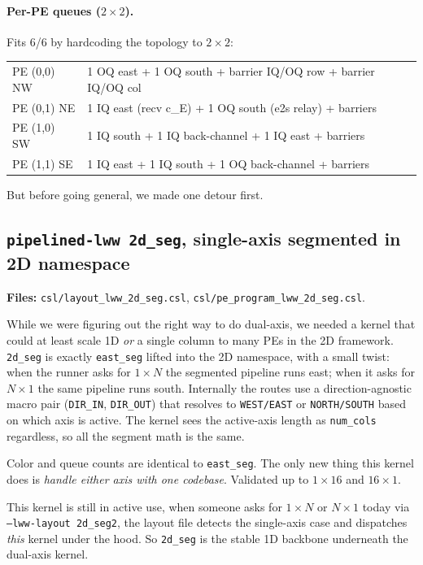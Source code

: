 \documentclass[11pt]{article}
\newcommand{\code}[1]{\texttt{#1}}
\newcommand{\file}[1]{\texttt{#1}}
\begin{document}
\paragraph{Per-PE queues ($2 \times 2$).} Fits 6/6 by hardcoding
the topology to $2 \times 2$:

\begin{center}\footnotesize
\begin{tabular}{ll}
\toprule
PE (0,0) NW & 1 OQ east + 1 OQ south + barrier IQ/OQ row + barrier IQ/OQ col \\
PE (0,1) NE & 1 IQ east (recv c\_E) + 1 OQ south (e2s relay) + barriers \\
PE (1,0) SW & 1 IQ south + 1 IQ back-channel + 1 IQ east + barriers \\
PE (1,1) SE & 1 IQ east + 1 IQ south + 1 OQ back-channel + barriers \\
\bottomrule
\end{tabular}
\end{center}

But before going general, we made one detour first.

\subsection{\code{pipelined-lww 2d\_seg}, single-axis segmented in 2D namespace}
\textbf{Files:} \file{csl/layout\_lww\_2d\_seg.csl},
\file{csl/pe\_program\_lww\_2d\_seg.csl}.

While we were figuring out the right way to do dual-axis, we
needed a kernel that could at least scale 1D \emph{or} a single
column to many PEs in the 2D framework. \code{2d\_seg} is exactly
\code{east\_seg} lifted into the 2D namespace, with a small
twist: when the runner asks for $1 \times N$ the segmented
pipeline runs east; when it asks for $N \times 1$ the same
pipeline runs south. Internally the routes use a
direction-agnostic macro pair (\code{DIR\_IN}, \code{DIR\_OUT})
that resolves to \code{WEST/EAST} or \code{NORTH/SOUTH} based on
which axis is active. The kernel sees the active-axis length as
\code{num\_cols} regardless, so all the segment math is the same.

Color and queue counts are identical to \code{east\_seg}. The
only new thing this kernel does is \emph{handle either axis with
one codebase}. Validated up to $1 \times 16$ and $16 \times 1$.

This kernel is still in active use, when someone asks for
$1 \times N$ or $N \times 1$ today via
\code{--lww-layout 2d\_seg2}, the layout file detects the
single-axis case and dispatches \emph{this} kernel under the
hood. So \code{2d\_seg} is the stable 1D backbone underneath the
dual-axis kernel.
\end{document}
